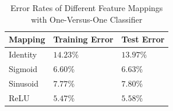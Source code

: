 \documentclass{article}
\begin{document}
\begin{table}
    \caption{Error Rates of Different Feature Mappings with One-Versus-One Classifier}
    \label{sample-table}
    \centering
    \begin{tabular}{l|ll}
      \toprule
      Mapping     & Training Error     & Test Error \\
      \midrule
      Identity & $14.23$\%  & $13.97$\%     \\
      Sigmoid     & $6.60$\% & $6.63$\%      \\
      Sinusoid     & $7.77$\%       & $7.80$\%  \\
      ReLU     & $5.47$\%       & $5.58$\%  \\
      \bottomrule
    \end{tabular}
  \end{table}
\end{document}
